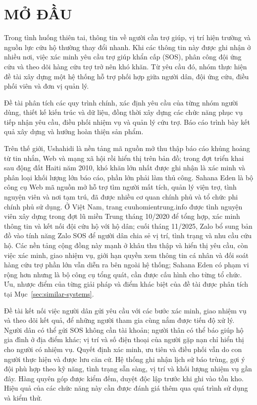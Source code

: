 \documentclass[12pt,a4paper,oneside]{report}
\newcommand{\frontchapter}[1]{%
  \chapter*{#1}%
  \phantomsection%
  \addcontentsline{toc}{chapter}{#1}%
  \markboth{#1}{}%
}
\begin{document}
\clearpage
{}
\frontchapter{MỞ ĐẦU}
Trong tình huống thiên tai, thông tin về người cần trợ giúp, vị trí hiện trường và nguồn lực cứu hộ thường thay đổi nhanh. Khi các thông tin này được ghi nhận ở nhiều nơi, việc xác minh yêu cầu trợ giúp khẩn cấp (SOS), phân công đội ứng cứu và theo dõi hàng cứu trợ trở nên khó khăn. Từ yêu cầu đó, nhóm thực hiện đề tài xây dựng một hệ thống hỗ trợ phối hợp giữa người dân, đội ứng cứu, điều phối viên và đơn vị quản lý.

Đề tài phân tích các quy trình chính, xác định yêu cầu của từng nhóm người dùng, thiết kế kiến trúc và dữ liệu, đồng thời xây dựng các chức năng phục vụ tiếp nhận yêu cầu, điều phối nhiệm vụ và quản lý cứu trợ. Báo cáo trình bày kết quả xây dựng và hướng hoàn thiện sản phẩm.

Trên thế giới, Ushahidi là nền tảng mã nguồn mở thu thập báo cáo khủng hoảng từ tin nhắn, Web và mạng xã hội rồi hiển thị trên bản đồ; trong đợt triển khai sau động đất Haiti năm 2010, khó khăn lớn nhất được ghi nhận là xác minh và phân loại khối lượng lớn báo cáo, phần lớn phải làm thủ công. Sahana Eden là bộ công cụ Web mã nguồn mở hỗ trợ tìm người mất tích, quản lý viện trợ, tình nguyện viên và nơi tạm trú, đã được nhiều cơ quan chính phủ và tổ chức phi chính phủ sử dụng. Ở Việt Nam, trang cuuhomientrung.info được tình nguyện viên xây dựng trong đợt lũ miền Trung tháng 10/2020 để tổng hợp, xác minh thông tin và kết nối đội cứu hộ với hộ dân; cuối tháng 11/2025, Zalo bổ sung bản đồ vào tính năng Zalo SOS để người dân chia sẻ vị trí, tình trạng và nhu cầu cứu hộ. Các nền tảng cộng đồng này mạnh ở khâu thu thập và hiển thị yêu cầu, còn việc xác minh, giao nhiệm vụ, giới hạn quyền xem thông tin cá nhân và đối soát hàng cứu trợ phần lớn vẫn diễn ra bên ngoài hệ thống; Sahana Eden có phạm vi rộng hơn nhưng là bộ công cụ tổng quát, cần được cấu hình cho từng tổ chức. Ưu, nhược điểm của từng giải pháp và điểm khác biệt của đề tài được phân tích tại Mục~\ref{sec:similar-systems}.

Đề tài kết nối việc người dân gửi yêu cầu với các bước xác minh, giao nhiệm vụ và theo dõi kết quả, để những người tham gia cùng nắm được tiến độ xử lý. Người dân có thể gửi SOS không cần tài khoản; người thân có thể báo giúp hộ gia đình ở địa điểm khác; vị trí và số điện thoại của người gặp nạn chỉ hiển thị cho người có nhiệm vụ. Quyết định xác minh, ưu tiên và điều phối vẫn do con người thực hiện và được lưu căn cứ. Hệ thống ghi nhận lịch sử báo trùng, gợi ý đội phù hợp theo kỹ năng, tình trạng sẵn sàng, vị trí và khối lượng nhiệm vụ gần đây. Hàng quyên góp được kiểm đếm, duyệt độc lập trước khi ghi vào tồn kho. Hiệu quả của các chức năng này cần được đánh giá thêm qua quá trình sử dụng và kiểm thử.
\end{document}
